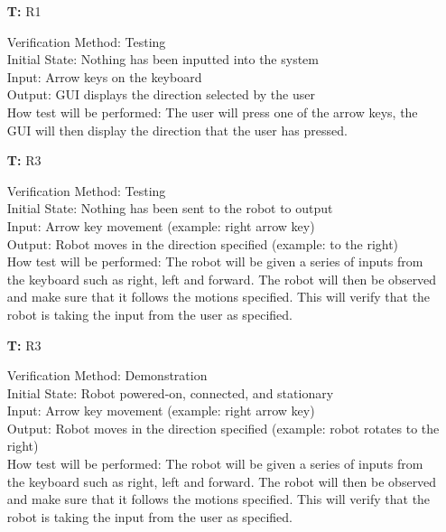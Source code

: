 \documentclass[12pt, titlepage]{article}
\newcounter{tnum} %
\begin{document}
\noindent \begin{itemize}
\item[\textbf{T\refstepcounter{tnum}\thetnum:}]{R1\\}

Verification Method: Testing	\\	
Initial State: Nothing has been inputted into the system\\
Input: Arrow keys on the keyboard \\ 
Output: GUI displays the direction selected by the user \\ 
How test will be performed: The user will press one of the arrow keys, the GUI will then display the direction that the user has pressed.\\

\item[\textbf{T\refstepcounter{tnum}\thetnum:}]{R3\\}

Verification Method: Testing	\\	
Initial State: Nothing has been sent to the robot to output \\
Input: Arrow key movement (example: right arrow key) \\ 
Output: Robot moves in the direction specified (example: to the right) \\ 
How test will be performed: The robot will be given a series of inputs from the keyboard such as right, left and forward. The robot will then be observed and make sure that it follows the motions specified. This will verify that the robot is taking the input from the user as specified. \\
	
\item[\textbf{T\refstepcounter{tnum}\thetnum:}]{R3\\}
 
Verification Method: Demonstration\\
Initial State: Robot powered-on, connected, and stationary \\
Input: Arrow key movement (example: right arrow key) \\ 
Output: Robot moves in the direction specified (example: robot rotates to the right) \\ 
How test will be performed: The robot will be given a series of inputs from the keyboard such as right, left and forward. The robot will then be observed and make sure that it follows the motions specified. This will verify that the robot is taking the input from the user as specified. \\


\end{itemize}
\end{document}
